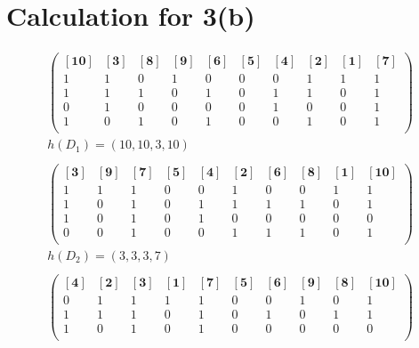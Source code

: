 \documentclass[11pt]{scrartcl}
\begin{document}
\section*{Calculation for 3(b)}

\begin{equation*}
\begin{aligned}
\begin{pmatrix}
\bm{[10]} & \bm{[3]} & \bm{[8]} & \bm{[9]} & \bm{[6]} & \bm{[5]} & \bm{[4]} & \bm{[2]} & \bm{[1]} & \bm{[7]}\\
1   &   1   &   0   &   1   &   0   &   0   &   0   &   1   &   1   &    1\\
1   &   1   &   1   &   0   &   1   &   0   &   1   &   1   &   0   &    1\\
0   &   1   &   0   &   0   &   0   &   0   &   1   &   0   &   0   &    1\\
1   &   0   &   1   &   0   &   1   &   0   &   0   &   1   &   0   &    1\\
\end{pmatrix}\\
h(D_1)=(10,10,3,10)\\
\\
\begin{pmatrix}
\bm{[3]} & \bm{[9]} & \bm{[7]} & \bm{[5]} & \bm{[4]} & \bm{[2]} & \bm{[6]} & \bm{[8]} & \bm{[1]} & \bm{[10]}\\
1   &   1   &   1   &   0   &   0   &   1   &   0   &   0   &   1   &    1\\
1   &   0   &   1   &   0   &   1   &   1   &   1   &   1   &   0   &    1\\
1   &   0   &   1   &   0   &   1   &   0   &   0   &   0   &   0   &    0\\
0   &   0   &   1   &   0   &   0   &   1   &   1   &   1   &   0   &    1\\
\end{pmatrix}\\
h(D_2)=(3,3,3,7)\\
\\
\begin{pmatrix}
\bm{[4]} & \bm{[2]} & \bm{[3]} & \bm{[1]} & \bm{[7]} & \bm{[5]} & \bm{[6]} & \bm{[9]} & \bm{[8]} & \bm{[10]}\\
0   &   1   &   1   &   1   &   1   &   0   &   0   &   1   &   0   &    1\\
1   &   1   &   1   &   0   &   1   &   0   &   1   &   0   &   1   &    1\\
1   &   0   &   1   &   0   &   1   &   0   &   0   &   0   &   0   &    0\\

\end{pmatrix}
\end{aligned}
\end{equation*}
\end{document}
